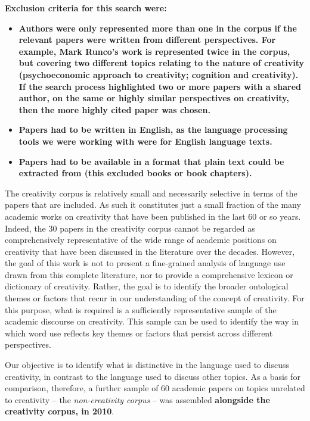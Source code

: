 \documentclass[10pt,letterpaper]{article}
\begin{document}
\textbf{Exclusion criteria for this search were: }
\begin{itemize}
\item \textbf{Authors were only represented more than one in the corpus if the relevant papers were written from different perspectives. For example, Mark Runco's work is represented twice in the corpus, but covering two different topics relating to the nature of creativity (psychoeconomic approach to creativity; cognition and creativity). If the search process highlighted two or more papers with a shared author, on the same or highly similar perspectives on creativity, then the more highly cited paper was chosen. }
\item \textbf{Papers had to be written in English, as the language processing tools we were working with were for English language texts.}
\item \textbf{Papers had to be available in a format that plain text could be extracted from (this excluded books or book chapters).}
\end{itemize}

The creativity corpus is relatively small and necessarily selective  in terms of the papers that are included. As such it constitutes just a small fraction of the many academic works on creativity that have been published in the last 60 or so years. Indeed, the 30 papers in the creativity corpus cannot be regarded as comprehensively representative of the wide range of academic positions on creativity that have been discussed in the literature over the decades. However, the goal of this work is not to present a fine-grained analysis of language use drawn from this complete literature, nor to provide a comprehensive lexicon or dictionary of creativity. Rather, the goal is to identify the broader ontological themes or factors that recur in our understanding of the concept of creativity. For this purpose, what is required is a sufficiently representative sample of the academic discourse on creativity. This sample can be used to identify the way in which word use reflects key themes or factors that persist across different perspectives.

Our objective is to identify what is distinctive in the language used to discuss creativity, in contrast to the language used to discuss other topics. As a basis for comparison, therefore, a further sample of 60 academic papers on topics unrelated to creativity -- the {\em non-creativity corpus} -- was assembled \textbf{alongside the creativity corpus, in 2010}. 
\end{document}
